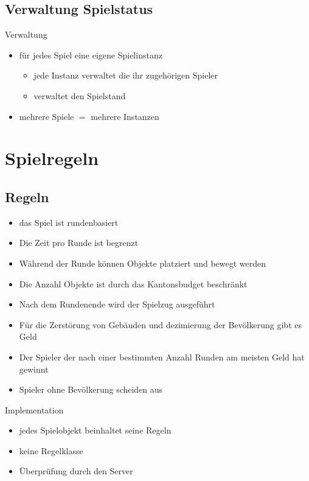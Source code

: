 \documentclass[12pt, utf8]{beamer}
\begin{document}
\subsection{Verwaltung Spielstatus}
\begin{frame}{Verwaltung}
	\begin{itemize}
		\item für jedes Spiel eine eigene Spielinstanz
			\begin{itemize}
		\item jede Instanz verwaltet die ihr zugehörigen Spieler
		\item verwaltet den Spielstand
			\end{itemize}
		\item mehrere Spiele $=$ mehrere Instanzen
	\end{itemize}
\end{frame}

\section{Spielregeln}
\subsection{Regeln}
\begin{frame}[allowframebreaks]
	\begin{itemize}
\item das Spiel ist rundenbasiert
\item Die Zeit pro Runde ist begrenzt
\item Während der Runde können Objekte platziert und bewegt werden
\item Die Anzahl Objekte ist durch das Kantonsbudget beschränkt
\item Nach dem Rundenende wird der Spielzug ausgeführt
\item Für die Zerstörung von Gebäuden und dezimierung der Bevölkerung gibt es Geld
\item Der Spieler der nach einer bestimmten Anzahl Runden am meisten Geld hat gewinnt
\item Spieler ohne Bevölkerung scheiden aus
\end{itemize}
	\begin{exampleblock}{Implementation}
		\begin{itemize}
\item jedes Spielobjekt beinhaltet seine Regeln
\item keine Regelklasse
\item Überprüfung durch den Server
\end{itemize}
\end{exampleblock}
\end{frame}
\end{document}
